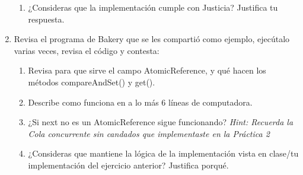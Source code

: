 \begin{enumerate}
\begin{enumerate}
        \item ¿Consideras que la implementación cumple con Justicia? Justifica tu respuesta.
    \end{enumerate}

    \hfill

    \item Revisa el programa de Bakery que se les compartió como ejemplo, ejecútalo varias veces, revisa el código y contesta:

    \begin{enumerate}
        \item Revisa para que sirve el campo AtomicReference, y qué hacen los métodos compareAndSet() y get().

        \item Describe como funciona en a lo más 6 líneas de computadora.

        \item ¿Si next no es un AtomicReference sigue funcionando? \textit{Hint: Recuerda la Cola concurrente sin candados que implementaste en la Práctica 2}

        \item ¿Consideras que mantiene la lógica de la implementación vista en clase/tu implementación del ejercicio anterior? Justifica porqué.
    \end{enumerate}
\end{enumerate}
